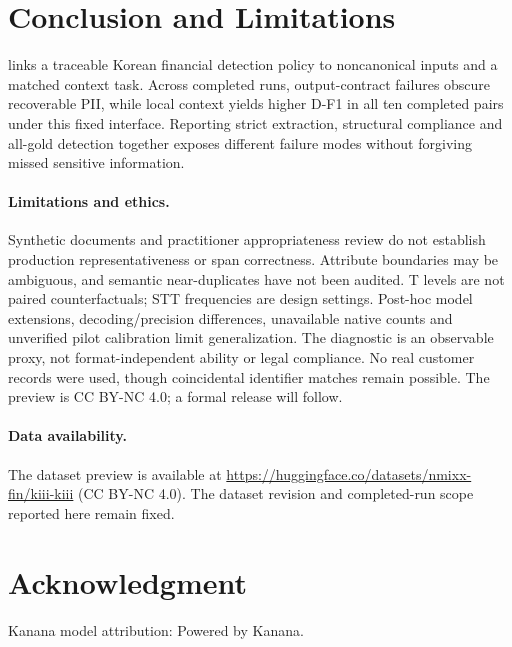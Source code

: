 \section{Conclusion and Limitations}
\label{sec:conclusion}

\kiii{} links a traceable Korean financial detection policy to noncanonical inputs and a matched context task. Across completed runs, output-contract failures obscure recoverable PII, while local context yields higher D-F1 in all ten completed pairs under this fixed interface. Reporting strict extraction, structural compliance and all-gold detection together exposes different failure modes without forgiving missed sensitive information.

\paragraph{Limitations and ethics.}
Synthetic documents and practitioner appropriateness review do not establish production representativeness or span correctness. Attribute boundaries may be ambiguous, and semantic near-duplicates have not been audited. T levels are not paired counterfactuals; STT frequencies are design settings. Post-hoc model extensions, decoding/precision differences, unavailable native counts and unverified pilot calibration limit generalization. The diagnostic is an observable proxy, not format-independent ability or legal compliance. No real customer records were used, though coincidental identifier matches remain possible. The preview is CC BY-NC 4.0; a formal release will follow.

\paragraph{Data availability.}
The dataset preview is available at \url{https://huggingface.co/datasets/nmixx-fin/kiii-kiii} (CC BY-NC 4.0). The dataset revision and completed-run scope reported here remain fixed.

\section*{Acknowledgment}


Kanana model attribution: Powered by Kanana.
